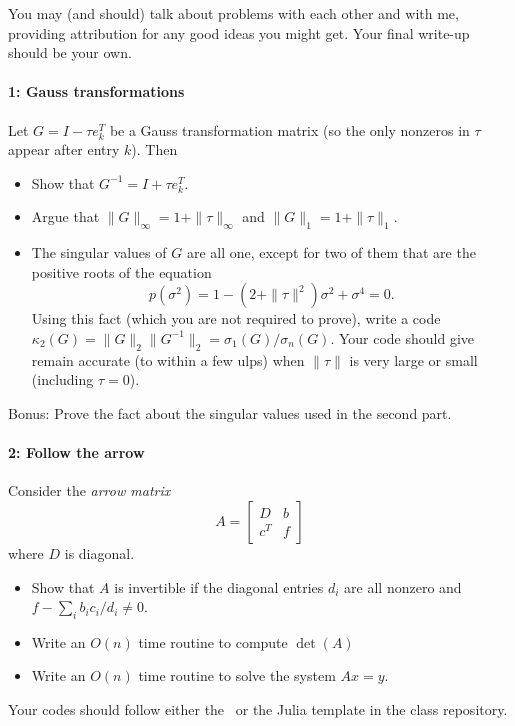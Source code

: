 \documentclass[12pt, leqno]{article} %
\begin{document}

You may (and should) talk about problems with each other and with me,
providing attribution for any good ideas you might get.  Your final
write-up should be your own.

\paragraph*{1: Gauss transformations}
Let $G = I-\tau e_k^T$ be a Gauss transformation matrix (so the only
nonzeros in $\tau$ appear after entry $k$).  Then
\begin{itemize}
\item Show that $G^{-1} = I+\tau e_k^T$.
\item Argue that $\|G\|_\infty = 1 + \|\tau\|_\infty$ and
  $\|G\|_1 = 1 + \|\tau\|_1$.
\item The singular values of $G$ are all one, except for two of them
  that are the positive roots of the equation
  \[
    p(\sigma^2) = 1 - (2+\|\tau\|^2) \sigma^2 + \sigma^4 = 0.
  \]
  Using this fact (which you are not required to prove), write a code
  $\kappa_2(G) = \|G\|_2 \|G^{-1}\|_2 = \sigma_1(G) / \sigma_n(G)$.
  Your code should give remain accurate (to within a few ulps) when
  $\|\tau\|$ is very large or small (including $\tau = 0$).
\end{itemize}
Bonus: Prove the fact about the singular values used in the second part.

\paragraph*{2: Follow the arrow}
Consider the {\em arrow matrix}
\[
  A = \begin{bmatrix} D & b \\ c^T & f \end{bmatrix}
\]
where $D$ is diagonal.
\begin{itemize}
\item Show that $A$ is invertible if the diagonal entries $d_i$ are
  all nonzero and $f-\sum_i b_i c_i / d_i \neq 0$.
\item Write an $O(n)$ time routine to compute $\det(A)$
\item Write an $O(n)$ time routine to solve the system $Ax = y$.
\end{itemize}
Your codes should follow either the \matlab\ or the Julia template in
the class repository.
\end{document}
